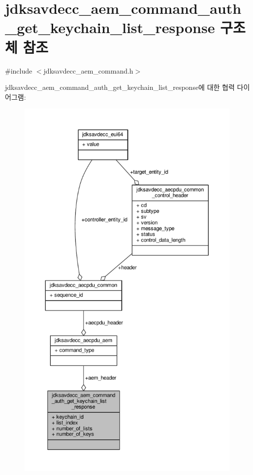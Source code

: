 \hypertarget{structjdksavdecc__aem__command__auth__get__keychain__list__response}{}\section{jdksavdecc\+\_\+aem\+\_\+command\+\_\+auth\+\_\+get\+\_\+keychain\+\_\+list\+\_\+response 구조체 참조}
\label{structjdksavdecc__aem__command__auth__get__keychain__list__response}


{\ttfamily \#include $<$jdksavdecc\+\_\+aem\+\_\+command.\+h$>$}



jdksavdecc\+\_\+aem\+\_\+command\+\_\+auth\+\_\+get\+\_\+keychain\+\_\+list\+\_\+response에 대한 협력 다이어그램\+:
\nopagebreak
\begin{figure}[H]
\begin{center}
\leavevmode
\includegraphics[height=550pt]{structjdksavdecc__aem__command__auth__get__keychain__list__response__coll__graph}
\end{center}
\end{figure}
